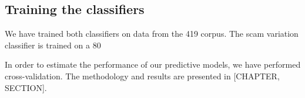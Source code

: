 \begin{table}[h]
  \centering
   \caption{Feature selection for scam variation classifier and PQ classifier}
\end{table}

\subsection{Training the classifiers}

We have trained both classifiers on data from the 419 corpus.  The scam variation classifier is trained on a 80%

In order to estimate the performance of our predictive models, we have performed cross-validation. The methodology and results are presented in [CHAPTER, SECTION].